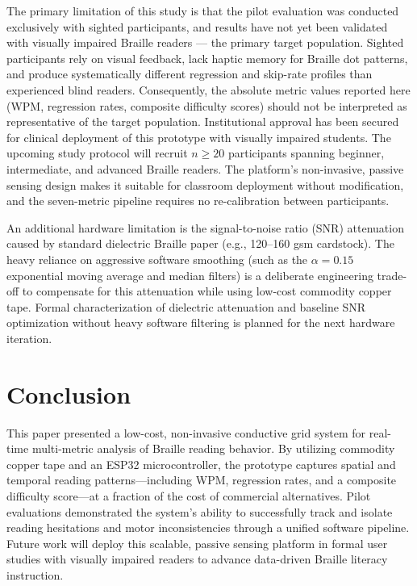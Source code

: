 \documentclass[conference]{IEEEtran}
\begin{document}
    The primary limitation of this study is that the pilot evaluation was
    conducted exclusively with sighted participants, and results have not yet
    been validated with visually impaired Braille readers --- the primary target
    population. Sighted participants rely on visual feedback, lack haptic memory
    for Braille dot patterns, and produce systematically different regression and
    skip-rate profiles than experienced blind readers. Consequently, the absolute
    metric values reported here (WPM, regression rates, composite difficulty
    scores) should not be interpreted as representative of the target population.
    Institutional approval has been secured for clinical deployment of this prototype with visually impaired students. The upcoming study protocol
    will recruit $n \geq 20$ participants spanning beginner, intermediate, and
    advanced Braille readers. The platform's non-invasive, passive sensing design
    makes it suitable for classroom deployment without modification, and the
    seven-metric pipeline requires no re-calibration between participants.

    An additional hardware limitation is the signal-to-noise ratio (SNR) attenuation caused by standard dielectric Braille paper (e.g., 120--160 gsm cardstock). The heavy reliance on aggressive software smoothing (such as the $\alpha = 0.15$ exponential moving average and median filters) is a deliberate engineering trade-off to compensate for this attenuation while using low-cost commodity copper tape. Formal characterization of dielectric attenuation and baseline SNR optimization without heavy software filtering is planned for the next hardware iteration.

    \section{Conclusion}
    \label{sec:conclusion}

    This paper presented a low-cost, non-invasive conductive grid system for real-time multi-metric analysis of Braille reading behavior. By utilizing commodity copper tape and an ESP32 microcontroller, the prototype captures spatial and temporal reading patterns---including WPM, regression rates, and a composite difficulty score---at a fraction of the cost of commercial alternatives. Pilot evaluations demonstrated the system's ability to successfully track and isolate reading hesitations and motor inconsistencies through a unified software pipeline. Future work will deploy this scalable, passive sensing platform in formal user studies with visually impaired readers to advance data-driven Braille literacy instruction.

    \balance
    
    

    
\end{document}
